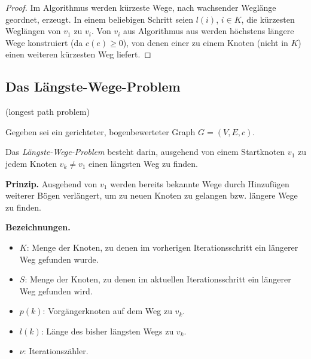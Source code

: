 \begin{proof}
  Im Algorithmus werden kürzeste Wege, nach wachsender Weglänge geordnet,
  erzeugt. In einem beliebigen Schritt seien $l(i)$, $i \in K$, die kürzesten
  Weglängen von $v_1$ zu $v_i$. Von $v_i$ aus Algorithmus aus werden höchstens
  längere Wege konstruiert (da $c(e) \ge 0$), von denen einer zu einem Knoten
  (nicht in $K$) einen weiteren kürzesten Weg liefert.
\end{proof}

\subsection{Das Längste-Wege-Problem}
(longest path problem)

Gegeben sei ein gerichteter, bogenbewerteter Graph $G = (V,E,c)$.

\begin{defn}
  Das \emph{Längste-Wege-Problem} besteht darin, ausgehend von einem Startknoten
  $v_1$ zu jedem Knoten $v_k \ne v_1$ einen längsten Weg zu finden.
\end{defn}

\textbf{Prinzip.} Ausgehend von $v_1$ werden bereits bekannte Wege durch
Hinzufügen weiterer Bögen verlängert, um zu neuen Knoten zu gelangen bzw.
längere Wege zu finden.

\textbf{Bezeichnungen.}
\begin{itemize}
\item $K$: Menge der Knoten, zu denen im vorherigen Iterationsschritt ein
  längerer Weg gefunden wurde.
\item $S$: Menge der Knoten, zu denen im aktuellen Iterationsschritt ein
  längerer Weg gefunden wird.
\item $p(k)$: Vorgängerknoten auf dem Weg zu $v_k$.
\item $l(k)$: Länge des bisher längsten Wegs zu $v_k$.
\item $\nu$: Iterationszähler.
\end{itemize}


